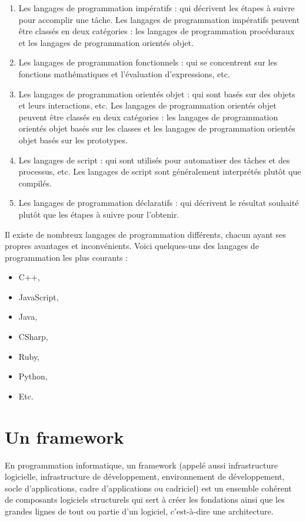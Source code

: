 \begin{enumerate}
    \item Les langages de programmation impératifs : qui décrivent les étapes à suivre pour
    accomplir une tâche. Les langages de programmation impératifs peuvent être classés en
    deux catégories : les langages de programmation procéduraux et les langages de programmation
    orientés objet.
    \item Les langages de programmation fonctionnels : qui se concentrent sur les fonctions
    mathématiques et l'évaluation d'expressions, etc.
    \item Les langages de programmation orientés objet : qui sont basés sur des objets et
    leurs interactions,  etc. Les langages de programmation orientés objet peuvent être classés
    en deux catégories : les langages de programmation orientés objet basés sur les classes et
    les langages de programmation orientés objet basés sur les prototypes.
    \item Les langages de script : qui sont utilisés pour automatiser des tâches et des processus, etc.
    Les langages de script sont généralement interprétés plutôt que compilés.
    \item Les langages de programmation déclaratifs : qui décrivent le résultat souhaité plutôt que
    les étapes à suivre pour l'obtenir.
\end{enumerate}

Il existe de nombreux langages de programmation différents, chacun ayant ses propres avantages et
inconvénients. Voici quelques-uns des langages de programmation les plus courants :
\begin{itemize}
    \item C++,
    \item JavaScript,
    \item Java,
    \item CSharp,
    \item Ruby,
    \item Python,
    \item Etc.
\end{itemize}

\section{Un framework}\label{sec:framework}
En programmation informatique, un framework (appelé aussi infrastructure logicielle,
infrastructure de développement, environnement de développement, socle d'applications,
cadre d'applications ou cadriciel) est un ensemble cohérent de composants logiciels
structurels qui sert à créer les fondations ainsi que les grandes lignes de tout ou partie
d'un logiciel, c'est-à-dire une architecture.

